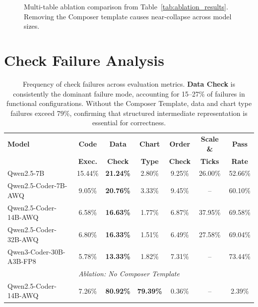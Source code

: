 \documentclass[a4paper,oneside,bibliography=totoc]{scrbook}
\begin{document}
\begin{figure}[h!]
\centering
{}
\caption{Multi-table ablation comparison from Table~\ref{tab:ablation_results}. Removing the Composer template causes near-collapse across model sizes.}
\label{fig:appendix_ablation_multitable}
\end{figure}


\section{Check Failure Analysis}

\begin{table}[h!]
\centering
\begin{tabular}{lcccccc}
\toprule
\textbf{Model} & \textbf{Code} & \textbf{Data} & \textbf{Chart} & \textbf{Order} & \textbf{Scale \&} & \textbf{Pass} \\
 & \textbf{Exec.} & \textbf{Check} & \textbf{Type} & \textbf{Check} & \textbf{Ticks} & \textbf{Rate} \\
\midrule
Qwen2.5-7B & 15.44\% & \textbf{21.24\%} & 2.80\% & 9.25\% & 26.00\% & 52.66\% \\
Qwen2.5-Coder-7B-AWQ & 9.05\% & \textbf{20.76\%} & 3.33\% & 9.45\% & -- & 60.10\% \\
Qwen2.5-Coder-14B-AWQ & 6.58\% & \textbf{16.63\%} & 1.77\% & 6.87\% & 37.95\% & 69.58\% \\
Qwen2.5-Coder-32B-AWQ & 6.80\% & \textbf{16.33\%} & 1.51\% & 6.49\% & 27.58\% & 69.04\% \\
Qwen3-Coder-30B-A3B-FP8 & 5.78\% & \textbf{13.33\%} & 1.82\% & 7.31\% & -- & 73.44\% \\
\midrule
\multicolumn{7}{c}{\textit{Ablation: No Composer Template}} \\
\midrule
Qwen2.5-Coder-14B-AWQ & 7.26\% & \textbf{80.92\%} & \textbf{79.39\%} & 0.36\% & -- & 2.39\% \\
\bottomrule
\end{tabular}
\caption{Frequency of check failures across evaluation metrics. \textbf{Data Check} is consistently the dominant failure mode, accounting for 15--27\% of failures in functional configurations. Without the Composer Template, data and chart type failures exceed 79\%, confirming that structured intermediate representation is essential for correctness.}
\label{tab:check_failures}
\end{table}
\end{document}
